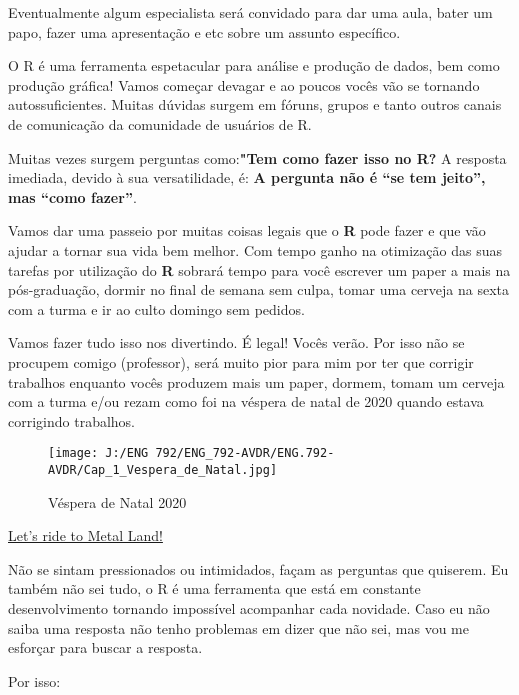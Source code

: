 \documentclass[
]{book}
\begin{document}
Eventualmente algum especialista será convidado para dar uma aula, bater um papo, fazer uma apresentação e etc sobre um assunto específico.

O R é uma ferramenta espetacular para análise e produção de dados, bem como produção gráfica! Vamos começar devagar e ao poucos vocês vão se tornando autossuficientes.
Muitas dúvidas surgem em fóruns, grupos e tanto outros canais de comunicação da comunidade de usuários de R.

Muitas vezes surgem perguntas como:\textbf{"Tem como fazer isso no R?} A resposta imediada, devido à sua versatilidade, é: \textbf{A pergunta não é ``se tem jeito'', mas ``como fazer''}.

Vamos dar uma passeio por muitas coisas legais que o \textbf{R} pode fazer e que vão ajudar a tornar sua vida bem melhor. Com tempo ganho na otimização das suas tarefas por utilização do \textbf{R} sobrará tempo para você escrever um paper a mais na pós-graduação, dormir no final de semana sem culpa, tomar uma cerveja na sexta com a turma e ir ao culto domingo sem pedidos.

Vamos fazer tudo isso nos divertindo. É legal! Vocês verão. Por isso não se procupem comigo (professor), será muito pior para mim por ter que corrigir trabalhos enquanto vocês produzem mais um paper, dormem, tomam um cerveja com a turma e/ou rezam como foi na véspera de natal de 2020 quando estava corrigindo trabalhos.

\begin{figure}
\hypertarget{id}{%
\centering
\texttt{[image: J:/ENG 792/ENG\_792-AVDR/ENG.792-AVDR/Cap\_1\_Vespera\_de\_Natal.jpg]}
\caption{Véspera de Natal 2020}\label{id}
}
\end{figure}

\href{https://www.youtube.com/watch?v=N8E4s8yAoX4\&ab_channel=MassacrationOficial}{Let's ride to Metal Land!}

Não se sintam pressionados ou intimidados, façam as perguntas que quiserem. Eu também não sei tudo, o R é uma ferramenta que está em constante desenvolvimento tornando impossível acompanhar cada novidade. Caso eu não saiba uma resposta não tenho problemas em dizer que não sei, mas vou me esforçar para buscar a resposta.

Por isso:
\end{document}
